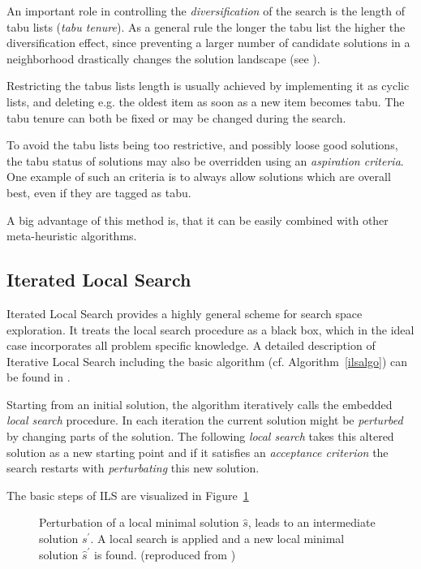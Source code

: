 An important role in controlling the \emph{diversification} of the search is the length of tabu lists (\emph{tabu tenure}).  
As a general rule the longer the tabu list the higher the diversification effect, since preventing a larger number of candidate solutions in a neighborhood drastically changes the solution landscape (see \cite{blum2003metaheuristics}). 

Restricting the tabus lists length is usually achieved by implementing it as cyclic lists, and deleting e.g. the oldest item as soon as a new item becomes tabu. 
The tabu tenure can both be fixed or may be changed during the search.

To avoid the tabu lists being too restrictive, and possibly loose good solutions, the tabu status of solutions may also be overridden using an \emph{aspiration criteria}. One example of such an criteria is to always allow solutions which are overall best, even if they are tagged as tabu.

A big advantage of this method is, that it can be easily combined with other meta-heuristic algorithms.

\subsection{Iterated Local Search}\label{sec:ils}
Iterated Local Search provides a highly general scheme for search space exploration. 
It treats the local search procedure as a black box, which in the ideal case incorporates all problem specific knowledge. 
A detailed description of Iterative Local Search including the basic algorithm (cf. Algorithm~\ref{ilsalgo}) can be found in \cite{lourencco2001iterated}.

Starting from an initial solution, the algorithm iteratively calls the embedded \emph{local search} procedure.
In each iteration the current solution might be \emph{perturbed} by changing parts of the solution. 
The following \emph{local search} takes this altered solution as a new starting point and if it satisfies an \emph{acceptance criterion} the search restarts with \emph{perturbating} this new solution. 

The basic steps of ILS are visualized in Figure~\ref{fig:fig_ils}

\begin{figure}[thb] 
   \footnotesize
   \centering
    \def\svgwidth{0.75\textwidth}
    
    \caption[Perturbation step in ILS]{Perturbation of a local minimal solution $\hat{s}$, leads to an intermediate solution $s^\prime$. A local search is applied and a new local minimal solution $\hat{s}^\prime$ is found. (reproduced from \cite{blum2003metaheuristics})}  
     \label{fig:fig_ils}
\end{figure}

